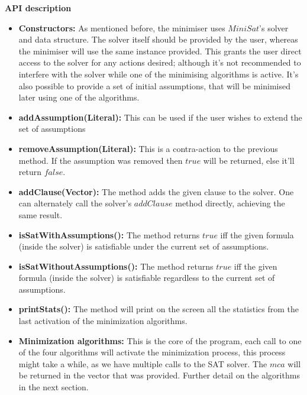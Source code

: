 \documentclass[]{article}
\begin{document}
   	\textbf{API description}
    \begin{itemize}
    	\item \textbf{Constructors:} As mentioned before, the minimiser uses $MiniSat$'s solver and data structure. The solver itself should be provided by the user, whereas the minimiser will use the same instance provided. This grants the user direct access to the solver for any actions desired; although it's not recommended to interfere with the solver while one of the minimising algorithms is active. It's also possible to provide a set of initial assumptions, that will be minimised later using one of the algorithms.    	
    	
    	\item \textbf{addAssumption(Literal):} This can be used if the user wishes to extend the set of assumptions
    	
    	\item \textbf{removeAssumption(Literal):} This is a contra-action to the previous method. If the assumption was removed then $  true $ will be returned, else it'll return $ false $.
    	
    	\item \textbf{addClause(Vector):} The method adds the given clause to the solver. One can alternately call the solver's $ addClause $ method directly, achieving the same result.
    	
    	\item \textbf{isSatWithAssumptions():} The method returns $ true $ iff the given formula (inside the solver) is satisfiable under the current set of assumptions.
    	
    	\item \textbf{isSatWithoutAssumptions():} The method returns $ true $ iff the given formula (inside the solver) is satisfiable regardless to the current set of assumptions.
    	
    	\item \textbf{printStats():} The method will print on the screen all the statistics from the last activation of the minimization algorithms.
    	
    	\item \textbf{Minimization algorithms:} This is the core of the program, each call to one of the four algorithms will activate the minimization process, this process might take a while, as we have multiple calls to the SAT solver. The $ mca $ will be returned in the vector that was provided. Further detail on the algorithms in the next section.
    \end{itemize}
\end{document}
